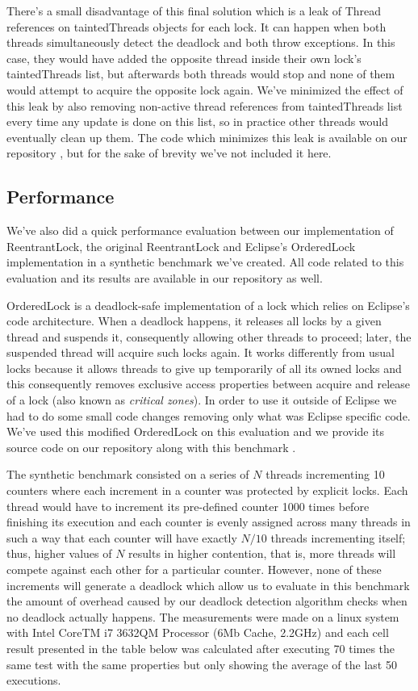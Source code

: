 There's a small disadvantage of this final solution which is a leak of Thread references on taintedThreads objects for each lock. It can happen when both threads
simultaneously detect the deadlock and both throw exceptions. In this case, they would have added the opposite thread inside their own lock's taintedThreads list, but afterwards
both threads would stop and none of them would attempt to acquire the opposite lock again. We've minimized the effect of this leak by also removing non-active thread
references from taintedThreads list every time any update is done on this list, so in practice other threads would eventually clean up them. The code which minimizes this
leak is available on our repository \cite{repo}, but for the sake of brevity we've not included it here.

\subsection{Performance}

We've also did a quick performance evaluation between our implementation of ReentrantLock, the original ReentrantLock and Eclipse's OrderedLock implementation \cite{orderedlock}
in a synthetic benchmark we've created. All code related to this evaluation and its results are available in our repository as well.

OrderedLock is a deadlock-safe implementation of a lock which relies on Eclipse's code architecture. When a deadlock happens, it releases all locks by a given thread and suspends it, consequently allowing other threads to proceed; later, the suspended thread will acquire such locks again. It works differently from usual locks because it allows threads to give up
temporarily of all its owned locks and this consequently removes exclusive access properties between acquire and release of a lock (also known as \emph{critical zones}). In order to use it outside of Eclipse we had to do some small code changes removing only what was Eclipse specific code. We've used this modified OrderedLock on this evaluation and we
provide its source code on our repository along with this benchmark \cite{repo}.

The synthetic benchmark consisted on a series of $N$ threads incrementing 10 counters where each increment in a counter was protected by explicit locks. Each thread would have to increment its pre-defined counter 1000 times before finishing its execution and each counter is evenly assigned across many threads in such a way that each counter will have exactly $N / 10$ threads incrementing itself; thus, higher values of $N$ results in higher contention, that is, more threads will compete against each other for a particular counter. However, none of these increments will generate a deadlock which allow us to evaluate in this benchmark the amount of overhead caused by our deadlock detection algorithm checks when no deadlock actually happens. The measurements were made on a linux system with Intel\textsuperscript{\textregistered} CoreTM i7­ 3632QM Processor (6Mb Cache, 2.2GHz) and each cell result presented in the table below was calculated after executing 70 times the same test with the same properties but only showing the average of the last 50 executions.

